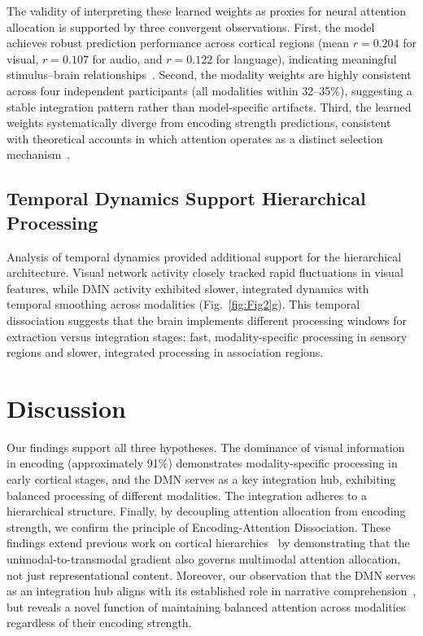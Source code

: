 \documentclass[10pt,letterpaper]{article}
\begin{document}
The validity of interpreting these learned weights as proxies for neural attention allocation is supported by three convergent observations. First, the model achieves robust prediction performance across cortical regions (mean $r = 0.204$ for visual, $r = 0.107$ for audio, and $r = 0.122$ for language), indicating meaningful stimulus–brain relationships~\citep{kriegeskorte2008representational,yamins2016using}. Second, the modality weights are highly consistent across four independent participants (all modalities within 32–35\%), suggesting a stable integration pattern rather than model-specific artifacts. Third, the learned weights systematically diverge from encoding strength predictions, consistent with theoretical accounts in which attention operates as a distinct selection mechanism~\citep{lindsay2020attention}.

\subsection{Temporal Dynamics Support Hierarchical Processing}

Analysis of temporal dynamics provided additional support for the hierarchical architecture. Visual network activity closely tracked rapid fluctuations in visual features, while DMN activity exhibited slower, integrated dynamics with temporal smoothing across modalities (Fig.~\ref{fig:Fig2}g). This temporal dissociation suggests that the brain implements different processing windows for extraction versus integration stages: fast, modality-specific processing in sensory regions and slower, integrated processing in association regions.

\section{Discussion}

Our findings support all three hypotheses. The dominance of visual information in encoding (approximately 91\%) demonstrates modality-specific processing in early cortical stages, and the DMN serves as a key integration hub, exhibiting balanced processing of different modalities. The integration adheres to a hierarchical structure. Finally, by decoupling attention allocation from encoding strength, we confirm the principle of Encoding-Attention Dissociation. These findings extend previous work on cortical hierarchies~\citep{margulies2016situating} by demonstrating that the unimodal-to-transmodal gradient also governs multimodal attention allocation, not just representational content. Moreover, our observation that the DMN serves as an integration hub aligns with its established role in narrative comprehension~\citep{simony2016dynamic}, but reveals a novel function of maintaining balanced attention across modalities regardless of their encoding strength.
\end{document}
